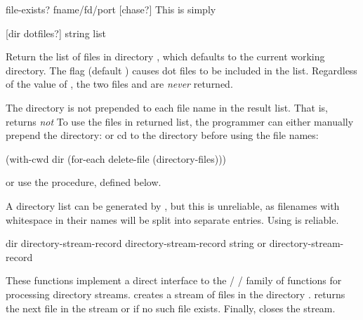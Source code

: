 \begin{defundesc}{file-exists?} {fname/fd/port [chase?]} \boolean    
    This is simply
\end{defundesc}

 {[dir dotfiles?]}      {string list}
\begin{desc}
    Return the list of files in directory , 
    which defaults to the current working directory.
    The  flag (default {\sharpf}) causes dot files to be
    included in the list.
    Regardless of the value of , the two files  and
     are \emph{never} returned.

    The directory  is not prepended to each file name in the
    result list. That is, 
    returns
    \emph{not}
    To use the files in returned list, the programmer can either manually
    prepend the directory:
    or cd to the directory before using the file names:
%
\begin{code}
(with-cwd dir
  (for-each delete-file (directory-files)))\end{code}
%    
    or use the  procedure, defined below.

    A directory list can be generated by , but this
    is unreliable, as filenames with whitespace in their names will be
    split into separate entries. Using  is reliable.
\end{desc}
    
 {dir} {directory-stream-record}
 {directory-stream-record} {string or \sharpf}
 {directory-stream-record} {\undefined}

These functions implement a direct interface to the
/
/
family of functions for processing directory streams.
 creates a stream of files in the
directory . 
returns the next file in the stream or \sharpf if no such file exists.
Finally,  closes the
stream.


